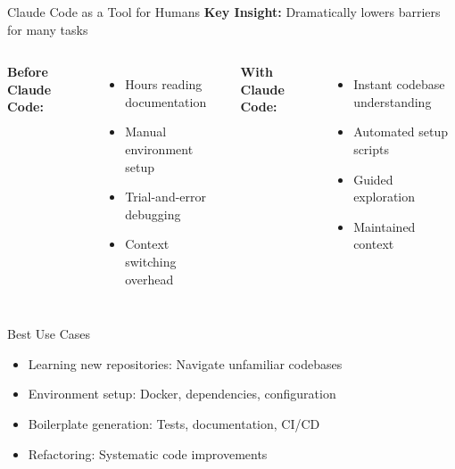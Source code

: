 \documentclass[aspectratio=169]{beamer}
\begin{document}
\begin{frame}{Claude Code as a Tool for Humans}
	\textbf{Key Insight:} {\color{highlight}Dramatically lowers barriers} for many tasks
	
	\vspace{0.5cm}

	\begin{columns}
		\textbf{Before Claude Code:}
		\begin{itemize}
			\item Hours reading documentation
			\item Manual environment setup
			\item Trial-and-error debugging
			\item Context switching overhead
		\end{itemize}
		
		\textbf{With Claude Code:}
		\begin{itemize}
			\item Instant codebase understanding
			\item Automated setup scripts
			\item Guided exploration
			\item Maintained context
		\end{itemize}
	\end{columns}
	
	\vspace{0.5cm}
	
	\begin{block}{Best Use Cases}
		\begin{itemize}
			\item {\color{highlight}Learning new repositories}: Navigate unfamiliar codebases
			\item {\color{highlight}Environment setup}: Docker, dependencies, configuration
			\item {\color{highlight}Boilerplate generation}: Tests, documentation, CI/CD
			\item {\color{highlight}Refactoring}: Systematic code improvements
		\end{itemize}
	\end{block}
\end{frame}
\end{document}
